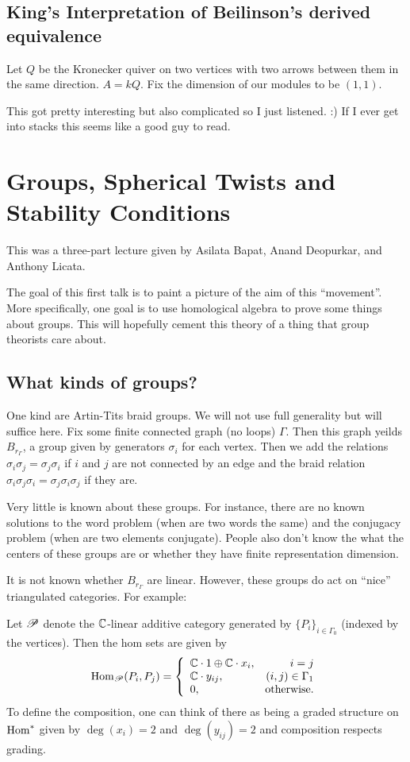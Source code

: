 \documentclass[12pt]{article}
\begin{document}
\subsection{King's Interpretation of Beilinson's derived equivalence}
Let $Q$ be the Kronecker quiver on two vertices with two arrows between them in the same direction. $A=kQ$. Fix the dimension of our modules to be $(1,1)$.

This got pretty interesting but also complicated so I just listened. :) If I ever get into stacks this seems like a good guy to read.

\section{Groups, Spherical Twists and Stability Conditions}
This was a three-part lecture given by Asilata Bapat, Anand Deopurkar, and Anthony Licata.

The goal of this first talk is to paint a picture of the aim of this ``movement''. More specifically, one goal is to use homological algebra
to prove some things about groups. This will hopefully cement this theory of a thing that group theorists care about.

\subsection{What kinds of groups?}
One kind are Artin-Tits braid groups. We will not use full generality but will suffice here. Fix some finite connected graph (no loops) $\Gamma$.
Then this graph yeilds $B_{r_\Gamma}$, a group given by generators $\sigma_i$ for each vertex. Then we add the relations 
$\sigma_i\sigma_j=\sigma_j\sigma_i$ if $i$ and $j$ are not connected by an edge and the braid relation $\sigma_i\sigma_j\sigma_i=\sigma_j\sigma_i\sigma_j$ if they are.

Very little is known about these groups. For instance, there are no known solutions to the word problem (when are two words the same) and the conjugacy problem (when are two elements conjugate). 
People also don't know the what the centers of these groups are or whether they have finite representation dimension.

It is not known whether $B_{r_\Gamma}$ are linear. However, these groups do act on ``nice'' triangulated categories. For example: 
\begin{ex}
	Let $\mathscr{P}$ denote the $\mathbb{C}$-linear additive category generated by $\{P_i\}_{i\in \Gamma_0}$ (indexed by the vertices). Then the hom sets are given by 
	\[\operatorname{Hom}_{\mathscr{P}}(P_i,P_j)=\left\{\begin{array}{lr}
		\mathbb{C}\cdot 1\oplus \mathbb{C} \cdot x_i, & i=j\\
		\mathbb{C}\cdot y_{ij}, & (i,j)\in\Gamma_1\\
		0, & \text{otherwise}.
	\end{array}\right.\]
	To define the composition, one can think of there as being a graded structure on $\operatorname{Hom}^\ast$ given by $\deg(x_i)=2$ and $\deg(y_{ij})=2$ and composition respects grading.
\end{ex}
\end{document}
